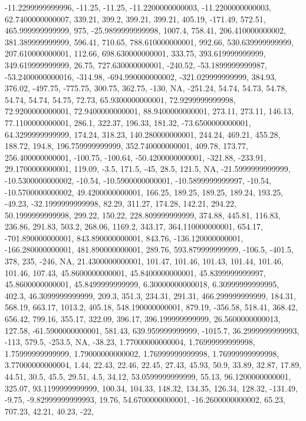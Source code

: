 \documentclass[
]{article}
\begin{document}
-11.2299999999996, -11.25, -11.25, -11.2200000000003, -11.2200000000003,
62.7400000000007, 339.21, 399.2, 399.21, 399.21, 405.19, -171.49,
572.51, 465.999999999999, 975, -25.9899999999998, 1007.4, 758.41,
206.410000000002, 381.389999999999, 596.41, 710.65, 788.610000000001,
992.66, 530.639999999999, 207.610000000001, 112.66, 698.630000000001,
333.75, 393.619999999999, 349.619999999999, 26.75, 727.630000000001,
-240.52, -53.1899999999987, -53.2400000000016, -314.98,
-694.990000000002, -321.029999999999, 384.93, 376.02, -497.75, -775.75,
300.75, 362.75, -130, NA, -251.24, 54.74, 54.73, 54.78, 54.74, 54.74,
54.75, 72.73, 65.9300000000001, 72.9299999999998, 72.9200000000001,
72.9400000000001, 88.9400000000001, 273.11, 273.11, 146.13,
77.1100000000001, 286.1, 322.37, 196.33, 181.32, -73.6500000000001,
64.3299999999999, 174.24, 318.23, 140.280000000001, 244.24, 469.21,
455.28, 188.72, 194.8, 196.759999999999, 352.740000000001, 409.78,
173.77, 256.400000000001, -100.75, -100.64, -50.4200000000001, -321.88,
-233.91, 29.1700000000001, 119.09, -3.5, 171.5, -45, 28.5, 121.5, NA,
-21.5999999999999, -10.5300000000002, -10.54, -10.5900000000001,
-10.5899999999997, -10.54, -10.5700000000002, 49.4200000000001, 166.25,
189.25, 189.25, 189.24, 193.25, -49.23, -32.1999999999998, 82.29,
311.27, 174.28, 142.21, 294.22, 50.1999999999998, 299.22, 150.22,
228.809999999999, 374.88, 445.81, 116.83, 236.86, 291.83, 503.2, 268.06,
1169.2, 343.17, 364.110000000001, 654.17, -701.890000000001,
843.890000000001, 843.76, -136.120000000001, -166.280000000001,
481.890000000001, 289.76, 593.879999999999, -106.5, -401.5, 378, 235,
-246, NA, 21.4300000000001, 101.47, 101.46, 101.43, 101.44, 101.46,
101.46, 107.43, 45.8600000000001, 45.8400000000001, 45.8399999999997,
45.8600000000001, 45.8499999999999, 6.30000000000018, 6.30999999999995,
402.3, 46.3099999999999, 209.3, 351.3, 234.31, 291.31, 466.299999999999,
184.31, 568.19, 663.17, 1013.2, 405.18, 548.190000000001, 879.19,
-356.58, 518.41, 368.42, 656.42, 799.16, 355.17, 322.09, 396.17,
396.199999999999, 26.5600000000013, 127.58, -61.5900000000001, 581.43,
639.959999999999, -1015.7, 36.2999999999993, -113, 579.5, -253.5, NA,
-38.23, 1.77000000000004, 1.76999999999998, 1.75999999999999,
1.79000000000002, 1.76999999999998, 1.76999999999998, 3.77000000000004,
1.44, 22.43, 22.46, 22.45, 27.43, 45.93, 50.9, 33.89, 32.87, 17.89,
44.51, 30.5, 45.5, 29.51, 4.5, 34.12, 53.0599999999999, 55.13,
96.1200000000001, 325.07, 93.1199999999999, 100.34, 104.33, 148.32,
134.35, 126.34, 128.32, -131.49, -9.75, -9.82999999999993, 19.76,
54.6700000000001, -16.2600000000002, 65.23, 707.23, 42.21, 40.23, -22,
\end{document}
